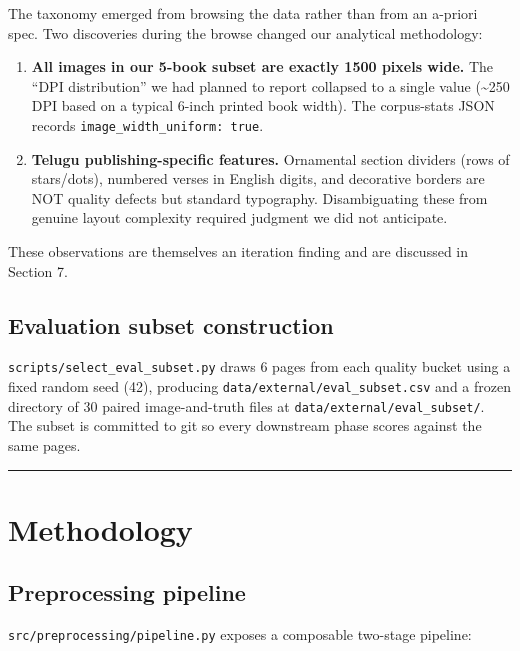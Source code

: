 \documentclass[
  letterpaper,
  DIV=11,
  numbers=noendperiod]{scrartcl}
\providecommand{\tightlist}{%
  \setlength{\itemsep}{0pt}\setlength{\parskip}{0pt}}
\begin{document}
The taxonomy emerged from browsing the data rather than from an a-priori
spec. Two discoveries during the browse changed our analytical
methodology:

\begin{enumerate}
\def\labelenumi{\arabic{enumi}.}
\tightlist
\item
  \textbf{All images in our 5-book subset are exactly 1500 pixels wide.}
  The ``DPI distribution'' we had planned to report collapsed to a
  single value (\textasciitilde250 DPI based on a typical 6-inch printed
  book width). The corpus-stats JSON records
  \texttt{image\_width\_uniform:\ true}.
\item
  \textbf{Telugu publishing-specific features.} Ornamental section
  dividers (rows of stars/dots), numbered verses in English digits, and
  decorative borders are NOT quality defects but standard typography.
  Disambiguating these from genuine layout complexity required judgment
  we did not anticipate.
\end{enumerate}

These observations are themselves an iteration finding and are discussed
in Section 7.

\subsection{Evaluation subset
construction}\label{evaluation-subset-construction}

\texttt{scripts/select\_eval\_subset.py} draws 6 pages from each quality
bucket using a fixed random seed (42), producing
\texttt{data/external/eval\_subset.csv} and a frozen directory of 30
paired image-and-truth files at \texttt{data/external/eval\_subset/}.
The subset is committed to git so every downstream phase scores against
the same pages.

\begin{center}\rule{0.5\linewidth}{0.5pt}\end{center}

\section{Methodology}\label{methodology}

\subsection{Preprocessing pipeline}\label{preprocessing-pipeline}

\texttt{src/preprocessing/pipeline.py} exposes a composable two-stage
pipeline:
\end{document}
